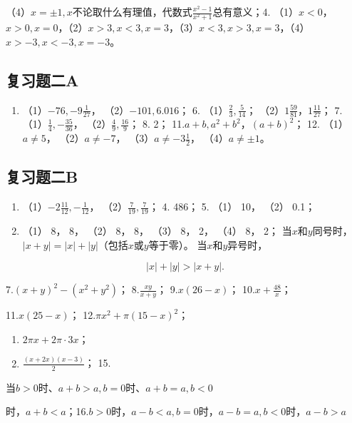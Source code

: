 （4）\(x = \pm 1, x\)不论取什么有理值，代数式\(\frac{x^2 - 1}{x^2 + 1}\)总有意义；4.
（1）\(x < 0\)，\(x > 0, x = 0\)，（2）\(x > 3, x < 3, x = 3\)，（3）\(x < 3, x > 3, x = 3\)，（4）\(x > -3, x < -3, x = -3\)。

\subsection{复习题二A}

\begin{enumerate}[start=5]
\item
  （1）\(-76, -9\frac{1}{27}\)， （2）\(-101, 6.016\)； 6.
  （1）\(\frac{2}{3}, \frac{5}{14}\)；
  （2）\(1\frac{59}{81}\)，\(1\frac{11}{27}\)； 7.
  （1）\(\frac{1}{4}, -\frac{35}{36}\)，
  （2）\(\frac{4}{9}, \frac{16}{9}\)； 8. 2；
  11.\(a + b, a^2 + b^2\)，\((a + b)^2\)； 12. （1）\(a \neq 5\)，
  （2）\(a \neq -7\)， （3）\(a \neq -3\frac{1}{2}\)，
  （4）\(a \neq \pm 1\)。
\end{enumerate}

\subsection{复习题二B}

\begin{enumerate}[start=3]
\item
  （1）\(-2\frac{11}{12}, -\frac{1}{12}\)，
  （2）\(\frac{7}{19}, \frac{7}{19}\)； 4. 486； 5. （1） 10， （2）
  0.1；
\item
  （1） 8， 8， （2） 8， 8， （3） 8， 2， （4） 8， 2；
  当\(x\)和\(y\)同号时，\(|x + y| = |x| + |y|\)（包括\(x\)或\(y\)等于零）。
  当\(x\)和\(y\)异号时，
\end{enumerate}

\[
| x | + | y | > | x + y |.
\]

7.\((x + y)^2 - (x^2 + y^2)\)； 8.\(\frac{xy}{x + y}\)；
9.\(x(26 - x)\)； 10.\(x + \frac{48}{x}\)；

11.\(x(25 - x)\)； 12.\(\pi x^2 + \pi (15 - x)^2\)；
\begin{enumerate}[start=13]
\item
  \(2\pi x + 2\pi \cdot 3x\)；
\item
  \(\frac{(x + 2x)(x - 3)}{2}\)； 15.
\end{enumerate}
当\(b > 0\)时、\(a + b > a, b = 0\)时、\(a + b = a, b < 0\)

时，\(a + b < a\)；16.\(b > 0\)时，\(a - b < a, b = 0\)时，\(a - b = a, b < 0\)时，\(a - b > a\)

